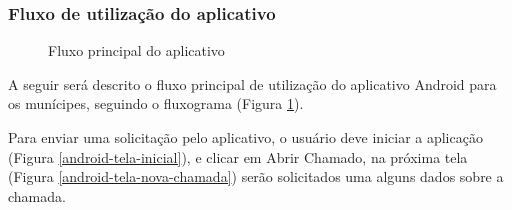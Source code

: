 \documentclass[
	article,			%
	11pt,				%
	oneside,			%
	a4paper,			%
	english,			%
	brazil,				%
	sumario=tradicional
	]{abntex2}
\begin{document}
\subsubsection{Fluxo de utilização do aplicativo}

\begin{figure}[!htbp]
 \centering
 \caption{\label{fluxo-app}Fluxo principal do aplicativo}
\end{figure}

A seguir será descrito o fluxo principal de utilização do aplicativo Android para os munícipes, seguindo o fluxograma (Figura \ref{fluxo-app}).

Para enviar uma solicitação pelo aplicativo, o usuário deve iniciar a aplicação (Figura \ref{android-tela-inicial}), e clicar em Abrir Chamado, na próxima tela (Figura \ref{android-tela-nova-chamada}) serão solicitados uma alguns dados sobre a chamada.
\end{document}
